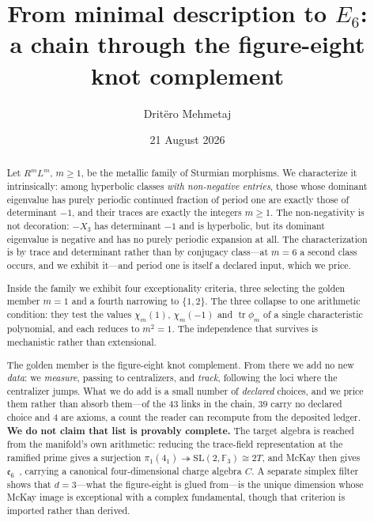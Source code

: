 \documentclass[11pt,reqno]{amsart}
\theoremstyle{plain}
\theoremstyle{definition}
\theoremstyle{remark}
\newcommand{\F}{\mathbb{F}}
\newcommand{\SL}{\mathrm{SL}}
\newcommand{\ee}{\mathfrak{e}}
\begin{document}
\title[From minimal description to $E_6$]{From minimal description to $E_6$:\\
a chain through the figure-eight knot complement}

\author{Drit\"ero Mehmetaj}
\address{Independent Researcher}

\date{21 August 2026}


\begin{abstract}
Let $R^mL^m$, $m\ge1$, be the metallic family of Sturmian morphisms. We characterize it
intrinsically: among hyperbolic classes \emph{with non-negative entries}, those whose
dominant eigenvalue has purely periodic continued fraction of period one are exactly
those of determinant $-1$, and their traces are exactly the integers $m\ge1$. The
non-negativity is not decoration: $-X_3$ has determinant $-1$ and is hyperbolic, but its
dominant eigenvalue is negative and has no purely periodic expansion at all. The characterization is by trace and
determinant rather than by conjugacy class---at $m=6$ a second class occurs, and we
exhibit it---and period one is itself a declared input, which we price.

Inside the family we exhibit four exceptionality criteria, three selecting the golden
member $m=1$ and a fourth narrowing to $\{1,2\}$. The three collapse to one arithmetic
condition: they test the values $\chi_m(1)$, $\chi_m(-1)$ and $\operatorname{tr}\phi_m$
of a single characteristic polynomial, and each reduces to $m^2=1$. The independence
that survives is mechanistic rather than extensional.

The golden member is the figure-eight knot complement. From there we add no new
\emph{data}: we \emph{measure}, passing to centralizers, and \emph{track}, following the
loci where the centralizer jumps. What we do add is a small number of \emph{declared}
choices, and we price them rather than absorb them---of the $43$ links in the chain,
$39$ carry no declared choice and $4$ are axioms, a count the reader can recompute from
the deposited ledger. \textbf{We do not claim that list is provably complete.} The target algebra is reached from the manifold's own arithmetic:
reducing the trace-field representation at the ramified prime gives a surjection
$\pi_1(4_1)\twoheadrightarrow\SL(2,\F_3)\cong2T$, and McKay then gives $\ee_6$~\cite{McKay}, carrying
a canonical four-dimensional charge algebra $C$. A separate simplex filter shows that
$d=3$---what the figure-eight is glued from---is the unique dimension whose McKay image
is exceptional with a complex fundamental, though that criterion is imported rather than
derived.


\end{abstract}
\end{document}
